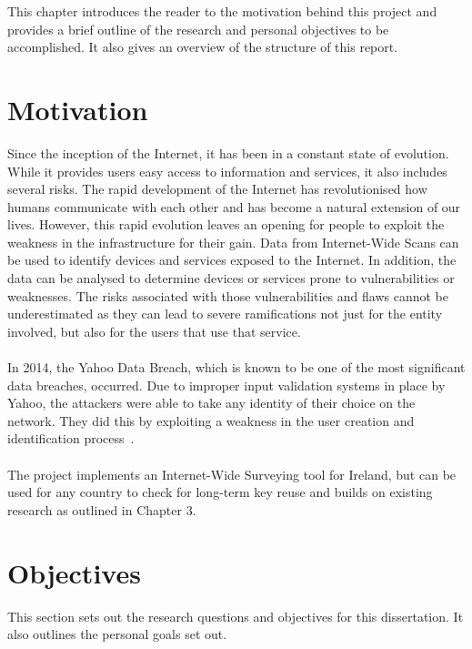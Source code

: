 This chapter introduces the reader to the motivation behind this project and provides a brief outline of the research 
and personal objectives to be accomplished. It also gives an overview of the structure of this report. 

\section{Motivation}
Since the inception of the Internet, it has been in a constant state of evolution. While it provides users easy access to information and services, it also 
includes several risks. The rapid development of the Internet has revolutionised how humans communicate with each other and has become a natural extension of our lives. 
However, this rapid evolution leaves an opening for people to exploit the weakness in the infrastructure for their gain. Data from Internet-Wide 
Scans can be used to identify devices and services exposed to the Internet. In addition, the data can be analysed to determine devices or services 
prone to vulnerabilities or weaknesses. The risks associated with those vulnerabilities and flaws cannot be underestimated as they can lead to severe 
ramifications not just for the entity involved, but also for the users that use that service.\\\\
In 2014, the Yahoo Data Breach, which is known to be one of the most significant data breaches, occurred. Due to improper input validation 
systems in place by Yahoo, the attackers were able to take any identity of their choice on the network. They did this by exploiting a 
weakness in the user creation and identification process~\cite{Insideth7:online}. \\\\
The project implements an Internet-Wide Surveying tool for Ireland, but can be used for any country to check for long-term key reuse and 
builds on existing research as outlined in Chapter 3. 
\pagebreak

\section{Objectives}
\label{resobjectives}
This section sets out the research questions and objectives for this dissertation. It also outlines the personal goals set out.
